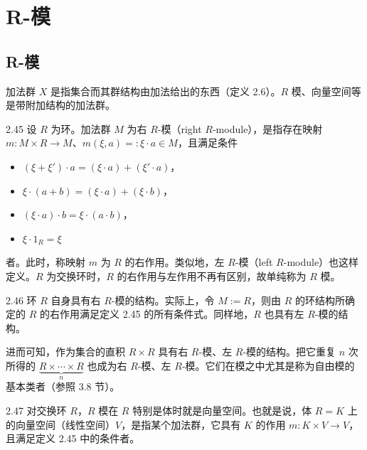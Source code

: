 \section{R-模}
\subsection{R-模}

加法群 $X$ 是指集合而其群结构由加法给出的东西（定义 2.6）。$R$ 模、向量空间等是带附加结构的加法群。

\begin{definition}{2.45} 设 $R$ 为环。加法群 $M$ 为右 $R$-模（right $R$-module），是指存在映射 $m\colon M\times R\to M$、$m(\xi,a)=:\xi\cdot a\in M$，且满足条件
\begin{itemize}
  \item $(\xi+\xi')\cdot a=(\xi\cdot a)+(\xi'\cdot a)$，
  \item $\xi\cdot(a+b)=(\xi\cdot a)+(\xi\cdot b)$，
  \item $(\xi\cdot a)\cdot b=\xi\cdot(a\cdot b)$，
  \item $\xi\cdot1_R=\xi$
\end{itemize}
者。此时，称映射 $m$ 为 $R$ 的右作用。类似地，左 $R$-模（left $R$-module）也这样定义。$R$ 为交换环时，$R$ 的右作用与左作用不再有区别，故单纯称为 $R$ 模。\end{definition}


\begin{example}{2.46} 环 $R$ 自身具有右 $R$-模的结构。实际上，令 $M:=R$，则由 $R$ 的环结构所确定的 $R$ 的右作用满足定义 2.45 的所有条件式。同样地，$R$ 也具有左 $R$-模的结构。

进而可知，作为集合的直积 $R\times R$ 具有右 $R$-模、左 $R$-模的结构。把它重复 $n$ 次所得的 $\underbrace{R\times\cdots\times R}_{n}$ 也成为右 $R$-模、左 $R$-模。它们在模之中尤其是称为自由模的基本类者（参照 3.8 节）。\end{example}

\begin{example}{2.47} 对交换环 $R$，$R$ 模在 $R$ 特别是体时就是向量空间。也就是说，体 $R=K$ 上的向量空间（线性空间）$V$，是指某个加法群，它具有 $K$ 的作用 $m\colon K\times V\to V$，且满足定义 2.45 中的条件者。\end{example}

